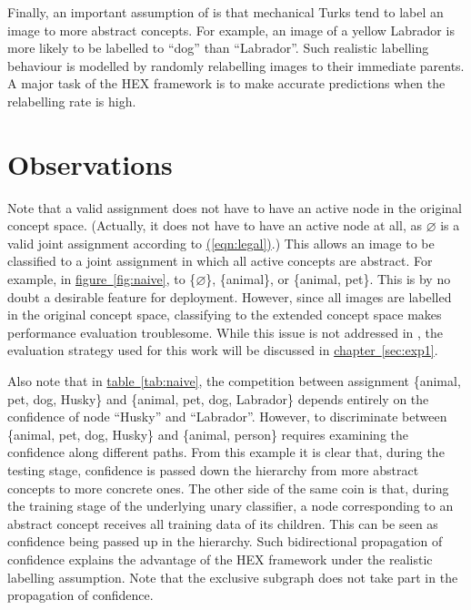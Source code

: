 \documentclass[11pt,a4paper]{book}
\begin{document}
Finally, an important assumption of \cite{deng2014large} is that mechanical Turks tend to label an image to more abstract concepts. For example, an image of a yellow Labrador is more likely to be labelled to ``dog'' than ``Labrador''. Such realistic labelling behaviour is modelled by randomly relabelling images to their immediate parents. A major task of the HEX framework is to make accurate predictions when the relabelling rate is high.

\section{Observations}
\label{sec:observ}

Note that a valid assignment does not have to have an active node in the original concept space. (Actually, it does not have to have an active node at all, as $\varnothing$ is a valid joint assignment according to \hyperref[eqn:legal]{(\ref{eqn:legal})}.) This allows an image to be classified to a joint assignment in which all active concepts are abstract. For example, in \hyperref[fig:naive]{figure~\ref{fig:naive}}, to \{$\varnothing$\}, \{animal\}, or \{animal, pet\}. This is by no doubt a desirable feature for deployment. However, since all images are labelled in the original concept space, classifying to the extended concept space makes performance evaluation troublesome. While this issue is not addressed in \cite{deng2014large}, the evaluation strategy used for this work will be discussed in \hyperref[sec:exp1]{chapter~\ref{sec:exp1}}.

Also note that in \hyperref[tab:naive]{table~\ref{tab:naive}}, the competition between assignment \{animal, pet, dog, Husky\} and \{animal, pet, dog, Labrador\} depends entirely on the confidence of node ``Husky'' and ``Labrador''. However, to discriminate between \{animal, pet, dog, Husky\} and \{animal, person\} requires examining the confidence along different paths. From this example it is clear that, during the testing stage, confidence is passed down the hierarchy from more abstract concepts to more concrete ones. The other side of the same coin is that, during the training stage of the underlying unary classifier, a node corresponding to an abstract concept receives all training data of its children. This can be seen as confidence being passed up in the hierarchy. Such bidirectional propagation of confidence explains the advantage of the HEX framework under the realistic labelling assumption. Note that the exclusive subgraph does not take part in the propagation of confidence.
\end{document}
